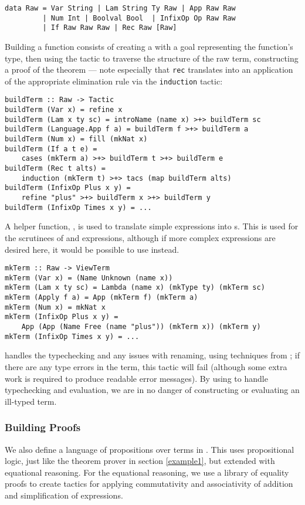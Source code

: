 \begin{verbatim}
data Raw = Var String | Lam String Ty Raw | App Raw Raw
         | Num Int | Boolval Bool  | InfixOp Op Raw Raw
         | If Raw Raw Raw | Rec Raw [Raw]
\end{verbatim}

Building a \Funl{} function consists of creating a  
with a goal representing the function's type, then using the
 tactic to traverse the
structure of the raw term, constructing a proof of the
theorem --- note especially that \texttt{rec} translates into an
application of the appropriate elimination rule via the
\texttt{induction} tactic:

\begin{verbatim}
buildTerm :: Raw -> Tactic
buildTerm (Var x) = refine x
buildTerm (Lam x ty sc) = introName (name x) >+> buildTerm sc
buildTerm (Language.App f a) = buildTerm f >+> buildTerm a
buildTerm (Num x) = fill (mkNat x)
buildTerm (If a t e) = 
    cases (mkTerm a) >+> buildTerm t >+> buildTerm e
buildTerm (Rec t alts) =
    induction (mkTerm t) >+> tacs (map buildTerm alts)
buildTerm (InfixOp Plus x y) = 
    refine "plus" >+> buildTerm x >+> buildTerm y
buildTerm (InfixOp Times x y) = ...
\end{verbatim}

A helper function, , is used to translate simple
expressions into s. This is used for the scrutinees of
 and  expressions, although if more complex
expressions are desired here, it would be possible to use
 instead.

\begin{verbatim}
mkTerm :: Raw -> ViewTerm
mkTerm (Var x) = (Name Unknown (name x))
mkTerm (Lam x ty sc) = Lambda (name x) (mkType ty) (mkTerm sc)
mkTerm (Apply f a) = App (mkTerm f) (mkTerm a)
mkTerm (Num x) = mkNat x
mkTerm (InfixOp Plus x y) = 
    App (App (Name Free (name "plus")) (mkTerm x)) (mkTerm y)
mkTerm (InfixOp Times x y) = ...
\end{verbatim}

\Ivor{} handles
the typechecking and any issues with renaming, using techniques from
\cite{not-a-number}; if there are any type errors in the 
term, this tactic will fail (although some extra work is required to
produce readable error messages). By using \Ivor{} to handle
typechecking and evaluation, we are in no danger of constructing or 
evaluating an ill-typed term.


\subsubsection{Building Proofs}
We also define a language of propositions over terms in \Funl{}.
This uses propositional logic, just like the theorem prover in
section \ref{example1}, but extended with equational reasoning. For
the equational reasoning, we use a library of equality proofs to
create tactics for applying commutativity and associativity of
addition and simplification of expressions.

